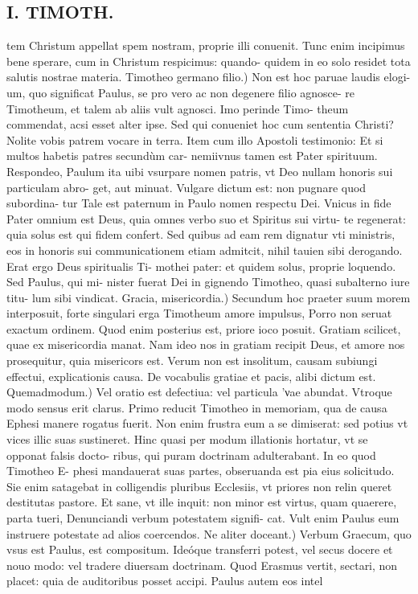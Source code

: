 \documentclass{article}
\begin{document}
\begin{pages}
\section*{I. TIMOTH. }
\marginpar{[ p.2 ]}\pstart tem Christum appellat spem nostram, proprie illi conuenit. Tunc enim incipimus bene sperare, cum in Christum respicimus: quando- quidem in eo solo residet tota salutis nostrae materia.  \pend\pstart Timotheo germano filio.) Non est hoc paruae laudis elogi- um, quo significat Paulus, se pro vero ac non degenere filio agnosce- re Timotheum, et talem ab aliis vult agnosci. Imo perinde Timo- theum commendat, acsi esset alter ipse. Sed qui conueniet hoc cum sententia Christi? Nolite vobis patrem vocare in terra. Item cum illo Apostoli testimonio: Et si multos habetis patres secundùm car- nemiivnus tamen est Pater spirituum. Respondeo, Paulum ita uibi vsurpare nomen patris, vt Deo nullam honoris sui particulam abro- get, aut minuat. Vulgare dictum est: non pugnare quod subordina- tur Tale est paternum in Paulo nomen respectu Dei. Vnicus in fide Pater omnium est Deus, quia omnes verbo suo et Spiritus sui virtu- te regenerat: quia solus est qui fidem confert. Sed quibus ad eam rem dignatur vti ministris, eos in honoris sui communicationem etiam admitcit, nihil tauien sibi derogando. Erat ergo Deus spiritualis Ti- mothei pater: et quidem solus, proprie loquendo. Sed Paulus, qui mi- nister fuerat Dei in gignendo Timotheo, quasi subalterno iure titu- lum sibi vindicat.  \pend\pstart Gracia, misericordia.) Secundum hoc praeter suum morem interposuit, forte singulari erga Timotheum amore impulsus, Porro non seruat exactum ordinem. Quod enim posterius est, priore ioco posuit. Gratiam scilicet, quae ex misericordia manat. Nam ideo nos in gratiam recipit Deus, et amore nos prosequitur, quia misericors est. Verum non est insolitum, causam subiungi effectui, explicationis causa. De vocabulis gratiae et pacis, alibi dictum est.  \pend\pstart Quemadmodum.) Vel oratio est defectiua: vel particula 'νae abundat. Vtroque modo sensus erit clarus. Primo reducit Timotheo in memoriam, qua de causa Ephesi manere rogatus fuerit. Non enim frustra eum a se dimiserat: sed potius vt vices illic suas sustineret. Hinc quasi per modum illationis hortatur, vt se opponat falsis docto- ribus, qui puram doctrinam adulterabant. In eo quod Timotheo E- phesi mandauerat suas partes, obseruanda est pia eius solicitudo. Sie enim satagebat in colligendis pluribus Ecclesiis, vt priores non relin queret destitutas pastore. Et sane, vt ille inquit: non minor est virtus, quam quaerere, parta tueri, Denunciandi verbum potestatem signifi- cat. Vult enim Paulus eum instruere potestate ad alios coercendos. Ne aliter doceant.) Verbum Graecum, quo vsus est Paulus, est compositum. Ideóque transferri potest, vel secus docere et nouo modo: vel tradere diuersam doctrinam. Quod Erasmus vertit, sectari, non placet: quia de auditoribus posset accipi. Paulus autem eos intel  \pend

\end{pages}
\end{document}
